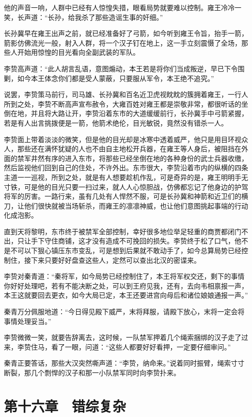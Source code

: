 他的声音一响，人群中已经有人惊惶失措，眼看局势就要难以控制。雍王冷冷一笑，长声道：“长孙，给我杀了那些造谣生事的奸细。”

长孙冀早在雍王出声之前，就已经准备好了弓箭，如今听到雍王令旨，抬手一箭，箭影仿佛流光一般，射入人群，将一个汉子钉在地上，这一手立刻震慑了全场，那些人开始用惊惶的目光看向全副武装的军队。

李贽高声道：“此人胡言乱语，意图煽动，本王若是将你们当成叛逆，早已下令围剿，如今本王体念你们都是受人蒙蔽，只要服从军令，本王绝不追究。”

说罢，李贽策马前行，司马雄、长孙冀和百名近卫虎视眈眈的簇拥着雍王，一行人所到之处，李贽不断高声宣布赦令，大雍百姓对雍王都是崇敬非常，都很听话的坐倒在地，并且将大路让开，李贽沿着东市的大道缓缓前行，长孙冀手中弓箭紧握，若是有人出言挑拨便是一箭，他箭术绝伦，目光敏锐，竟然没有错杀一人。

李贽面上带着淡淡的微笑，但是他的目光却是冰寒中透着威严，他只是用目环视众人，那些还在满怀犹疑的人也不由自主地松开兵器，在雍王等人身后，被阻挡在外面的禁军井然有序的进入东市，将那些已经坐倒在地的各种身份的武士兵器收缴，然后监视他们回到自己的住处，不许外出。东市很大，李贽沿着市内的纵横的四条主道一一巡视，所到之处，就是有人想要趁机作乱，可是奇异的是，雍王明明手无寸铁，可是他的目光只要一扫过来，就人人心惊胆战，仿佛都忘记了他身边的护驾将军的厉害。一路行来，虽有几处有人悍然不服，可是长孙冀和神箭和近卫们的横刀，让他们很快就被当场斩杀，而雍王的凛凛神威，也让他们意图挑起事端的行动化成泡影。

直到天将黎明，东市终于被禁军全部控制，幸好很多地位举足轻重的商贾都闭门不出，只让手下守住商铺，这才没有造成不可挽回的损失。李贽终于松了口气，他不是不可以下狠心镇压东市变乱，可是想到后果就不敢动手了，如今总算局势已经控制住，接下来只要好好盘查这些人，定然可以查出北汉的密谍来。

李贽对秦青道：“秦将军，如今局势已经控制住了，本王将军权交还，剩下的事情你好好处理吧，若有不能决断之处，可以到王府见我，还有，去向韦相禀报一声，本王这就要回去更衣，如今大局已定，本王还要进宫向母后和诸位娘娘通报一声。”

秦青万分佩服地道：“今日得见殿下威严，末将拜服，请殿下放心，末将一定会将事情处理妥当。”

李贽微微一笑，就要告辞离去，这时候，一队禁军押着几个绳索捆绑的汉子走了过来，李贽住马，看了一眼，问道：“这些人都要好好看押，一定要仔细审问。”

秦青正要答话，那些大汉突然嘶声道：“李贽，纳命来。”说着同时振臂，绳索寸寸断裂，那几个剽悍的汉子和那一小队禁军同时向李贽扑来。

\chapter{第十六章　错综复杂}

